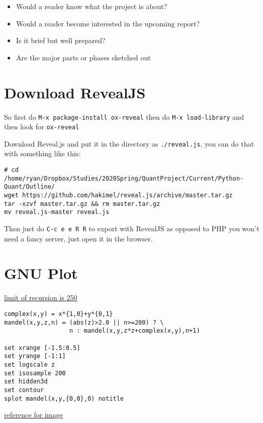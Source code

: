 \documentclass[11pt]{article}
\begin{document}
\begin{itemize}
\item Would a reader know what the project is about?
\item Would a reader become interested in the upcoming report?
\item Is it brief but well prepared?
\item Are the major parts or phases sketched out
\end{itemize}



\section{Download RevealJS}
\label{sec:orgad35b54}
So first do \texttt{M-x package-install ox-reveal} then do \texttt{M-x load-library} and then look for \texttt{ox-reveal}

Download Reveal.js and put it in the directory as \texttt{./reveal.js}, you can do that with something like this:

\begin{verbatim}
# cd /home/ryan/Dropbox/Studies/2020Spring/QuantProject/Current/Python-Quant/Outline/
wget https://github.com/hakimel/reveal.js/archive/master.tar.gz
tar -xzvf master.tar.gz && rm master.tar.gz
mv reveal.js-master reveal.js
\end{verbatim}

Then just do \texttt{C-c e e R R} to export with RevealJS as opposed to PHP you won't need a fancy server, just open it in the browser.
\section{GNU Plot}
\label{sec:org92db9c8}
\href{https://rosettacode.org/wiki/Find\_limit\_of\_recursion\#gnuplot}{limit of recursion is 250}

\begin{verbatim}
complex(x,y) = x*{1,0}+y*{0,1}
mandel(x,y,z,n) = (abs(z)>2.0 || n>=200) ? \
                  n : mandel(x,y,z*z+complex(x,y),n+1)

set xrange [-1.5:0.5]
set yrange [-1:1]
set logscale z
set isosample 200
set hidden3d
set contour
splot mandel(x,y,{0,0},0) notitle
\end{verbatim}

\begin{center}

\end{center}


\href{http://folk.uio.no/inf3330/scripting/doc/gnuplot/Kawano/fractal/mandelbrot-e.html}{reference for image}
\end{document}
